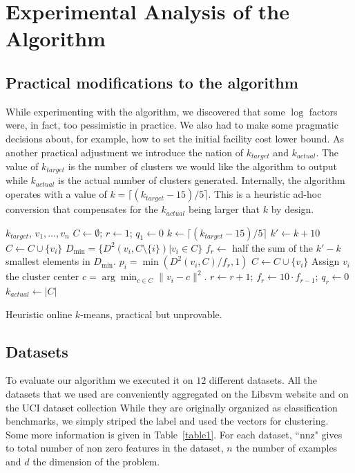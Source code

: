 \documentclass{article}
\def\tab{\hspace{5mm}}
\begin{document}
\section{Experimental Analysis of the Algorithm}
\subsection{Practical modifications to the algorithm}
While experimenting with the algorithm, we discovered that some $\log$ factors were, in fact, too pessimistic in practice.
We also had to make some pragmatic decisions about, for example, how to set the initial facility cost lower bound.
As another practical adjustment we introduce the nation of $k_{target}$ and $k_{actual}$.
The value of $k_{target}$ is the number of clusters we would like the algorithm to output while $k_{actual}$ is the actual number of clusters generated.
Internally, the algorithm operates with a value of $k = \lceil(k_{target}-15)/5\rceil$. 
This is a heuristic ad-hoc conversion that compensates for the $k_{actual}$ being larger that $k$ by design.

\begin{algorithm}
\begin{algorithmic}
 $k_{target}$,  $v_1,\ldots,v_n$
\STATE $C \gets \emptyset$;\;\; $r \gets 1$;\;\; $q_1 \gets 0$
\STATE $k \gets \lceil(k_{target}-15)/5\rceil$
\STATE $k' \gets k+10$
	\STATE \tab $C \gets C \cup \{v_i\}$
\ENDFOR
\STATE $D_{\min} = \{D^2(v_i,C \setminus \{i\}) | v_i \in C\}$
\STATE $f_r\gets$ half the sum of the $k'-k$ smallest elements in $D_{\min}$.
	 $p_i = \min(D^2(v_i, C)/f_r,1)$
	\STATE \tab $C \gets C \cup \{v_i\}$
	\STATE Assign $v_i$ the cluster center $c = \arg\min_{c \in C}\|v_i - c\|^2$.
		\STATE $r \gets r+1$;\;\;  $f_r \gets 10\cdot f_{r-1}$;\;\; $q_r \gets 0$
	\ENDIF
\ENDFOR
\STATE $k_{actual} \gets |C|$
\caption{Heuristic online $k$-means, practical but unprovable.}\label{alg2}
\end{algorithmic}
\end{algorithm}

\subsection{Datasets}
To evaluate our algorithm we executed it on $12$ different datasets.
All the datasets that we used are conveniently aggregated on the Libsvm website \cite{libsvmData} and on the UCI dataset collection \cite{UCIdata}
While they are originally organized as classification benchmarks, we simply striped the label and used the vectors for clustering.
Some more information is given in Table~\ref{table1}. 
For each dataset, ``nnz" gives to total number of non zero features in the dataset, $n$ the number of examples and $d$ the dimension of the problem.
\end{document}
